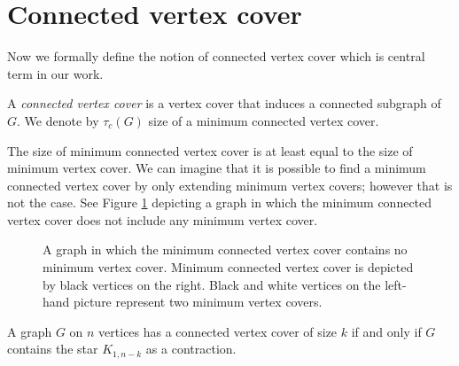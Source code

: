 \section{Connected vertex cover}
Now we formally define the notion of connected vertex cover which is central term in our work.
\begin{defn}
	A \emph{connected vertex cover} is a vertex cover that induces a connected subgraph of \(G\).
	We denote by \(\tau_c(G)\) size of a minimum connected vertex cover.
\end{defn}

The size of minimum connected vertex cover is at least equal to the size of minimum vertex cover.
We can imagine that it is possible to find a minimum connected vertex cover by only extending minimum
vertex covers; however that is not the case. See Figure \ref{VCnotCVC} depicting a graph in which the minimum connected vertex cover
does not include any minimum vertex cover.

\begin{figure}[b]
\centering
\begin{minipage}{.45\textwidth}
        \centering
        
        \caption*{}
\end{minipage}
\begin{minipage}{.45\textwidth}
        \centering
        
        \caption*{}
\end{minipage}
	\caption{A graph in which the minimum connected vertex cover contains no minimum vertex cover.
	Minimum connected vertex cover is depicted by black vertices on the right.
	Black and white vertices on the left-hand picture represent two minimum vertex covers. }
	\label{VCnotCVC}
\end{figure}

\begin{obs}
A graph \(G\) on \(n\) vertices has a connected vertex cover of size \(k\) if and
only if \(G\) contains the star \(K_{1,n-k}\) as a contraction.
\end{obs}

